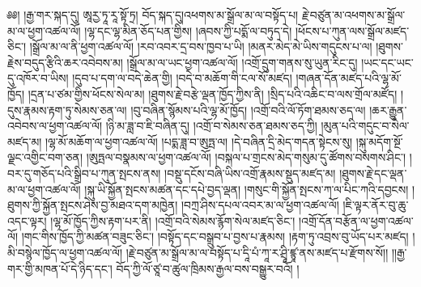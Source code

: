 ༅༅། །རྒྱ་གར་སྐད་དུ། ཨཱརྱ་ཏཱ་རཱ་སྟོ་ཏྲ། བོད་སྐད་དུ།འཕགས་མ་སྒྲོལ་མ་ལ་བསྟོད་པ། རྗེ་བཙུན་མ་འཕགས་མ་སྒྲོལ་མ་ལ་ཕྱག་འཚལ་ལོ། །ལྷ་དང་ལྷ་མིན་ཅོད་པན་གྱིས། །ཞབས་ཀྱི་པདྨོ་ལ་བཏུད་དེ། །ཕོངས་པ་ཀུན་ལས་སྒྲོལ་མཛད་ཅིང་། །སྒྲོལ་མ་ལ་ནི་ཕྱག་འཚལ་ལོ། །རབ་འབར་དྲ་བས་ཁྱབ་པ་ཡི། །མནར་མེད་མེ་ཡིས་གདུངས་པ་ལ། །ཐུགས་རྗེས་བདུད་རྩིའི་ཆར་འབེབས་མ། །སྒྲོལ་མ་ལ་ཡང་ཕྱག་འཚལ་ལོ། །འགྲོ་དྲུག་གནས་སུ་ཡུན་རིང་དུ། །ཡང་དང་ཡང་དུ་འཁོར་བ་ཡིས། །དུབ་པ་དག་ལ་བདེ་ཆེན་གྱི། །བདེ་བ་མཆོག་གི་ངལ་སོ་མཛད། །གཞན་དོན་མཛད་པའི་ལྷ་མོ་ཁྱོད། །དྲན་པ་ཙམ་གྱིས་ཕོངས་སེལ་མ། །ཐུགས་རྗེ་བརྩེ་ལྡན་ཁྱོད་ཀྱིས་ནི། །སྲིད་པའི་འཆིང་བ་ལས་གྲོལ་མཛོད། །དུས་རྣམས་རྟག་ཏུ་སེམས་ཅན་ལ། །བུ་བཞིན་སྙོམས་པའི་ལྷ་མོ་ཁྱོད། །འགྲོ་བའི་ལོ་ཏོག་ཐམས་ཅད་ལ། །ཆར་རྒྱུན་འབེབས་ལ་ཕྱག་འཚལ་ལོ། །ཉི་མ་ཟླ་བ་ཇི་བཞིན་དུ། །འགྲོ་བ་སེམས་ཅན་ཐམས་ཅད་ཀྱི། །མུན་པའི་གདུང་བ་སེལ་མཛད་མ། །ལྷ་མོ་མཆོག་ལ་ཕྱག་འཚལ་ལོ། །པདྨ་ཟླ་བ་ཨུཏྤ་ལ། །དེ་བཞིན་དྲི་མེད་གདན་སྟེངས་སུ། །སྐུ་མདོག་སྔོ་ལྗང་འགྱིང་བག་ཅན། །ཨུཏྤལ་བསྣམས་ལ་ཕྱག་འཚལ་ལོ། །བསྐལ་པ་གྲངས་མེད་གསུམ་དུ་ཚོགས་བསགས་ཤིང་། །བར་དུ་གཅོད་པའི་སྒྲིབ་པ་ཀུན་སྤངས་ནས། །བསྡུ་དངོས་བཞི་ཡིས་འགྲོ་རྣམས་སྡུད་མཛད་མ། །ཐུགས་རྗེ་དང་ལྡན་མ་ལ་ཕྱག་འཚལ་ལོ། །སྐུ་ཡི་སྐྱོན་སྤངས་མཚན་དང་དཔེ་བྱད་ལྡན། །གསུང་གི་སྐྱོན་སྤངས་ཀ་ལ་པིང་ཀའི་དབྱངས། །ཐུགས་ཀྱི་སྐྱོན་སྤངས་ཤེས་བྱ་མཐའ་དག་མཁྱེན། །བཀྲ་ཤིས་དཔལ་འབར་མ་ལ་ཕྱག་འཚལ་ལོ། །ཇི་ལྟར་ནོར་བུ་ཆུ་འདང་ལྟར། །ལྷ་མོ་ཁྱོད་ཀྱིས་རྟག་པར་ནི། །འགྲོ་བའི་སེམས་རྙོག་སེལ་མཛད་ཅིང་། །འགྲོ་དོན་བརྩོན་ལ་ཕྱག་འཚལ་ལོ། །གང་གིས་ཁྱོད་ཀྱི་མཚན་བཟུང་ཅིང་། །བསྟོད་དང་བསྒྲུབ་པ་བྱས་པ་རྣམས། །རྟག་ཏུ་འབྲས་བུ་ཡོད་པར་མཛད། །མི་བསྙེལ་ཁྱོད་ལ་ཕྱག་འཚལ་ལོ། །རྗེ་བཙུན་མ་སྒྲོལ་མ་ལ་བསྟོད་པ་དཱི་པཾ་ཀཱ་ར་ཤྲཱི་ཛྙཱ་ནས་མཛད་པ་རྫོགས་སོ།། །།རྒྱ་གར་གྱི་མཁན་པོ་དེ་ཉིད་དང་། བོད་ཀྱི་ལོ་ཙཱ་བ་ཚུལ་ཁྲིམས་རྒྱལ་བས་བསྒྱུར་བའོ། །